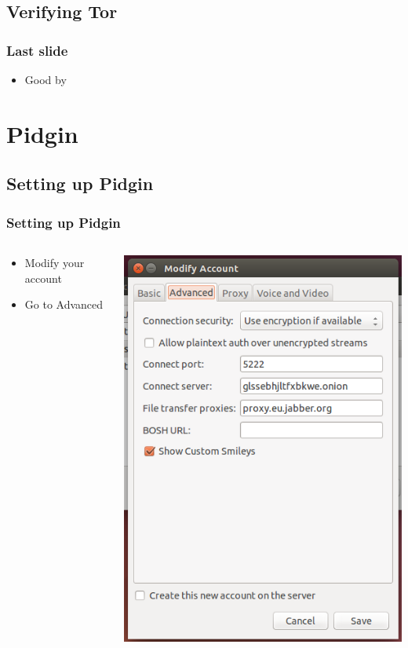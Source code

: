 \documentclass{beamer}
\begin{document}
\subsection{Verifying Tor}
\begin{frame}
\frametitle{Last slide}
\begin{itemize}
\item Good by
\end{itemize}
\end{frame}


\section{Pidgin}
\subsection{Setting up Pidgin}
\begin{frame}
\frametitle{Setting up Pidgin}
\begin{columns}
    \begin{column}{0.48\textwidth}
        \begin{itemize}
          \item Modify your account
          \item Go to Advanced
        \end{itemize}
    \end{column}
    \begin{column}{.5\textwidth}
        \includegraphics[width=.9\linewidth]{pidgin_advanced}
    \end{column}
\end{columns}
\end{frame}
\end{document}
